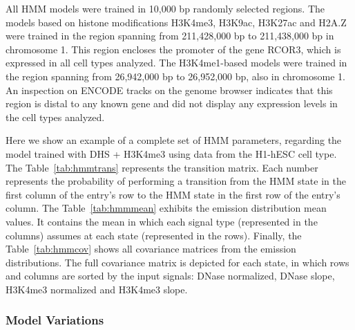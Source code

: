 
All HMM models were trained in 10,000 bp randomly selected regions.
The models based on histone modifications H3K4me3, H3K9ac, H3K27ac
and H2A.Z were trained in the region spanning from 211,428,000 bp to
211,438,000 bp in chromosome 1. This region encloses the promoter of 
the gene RCOR3, which is expressed in all cell types analyzed.
The H3K4me1-based models were trained in the region spanning from 26,942,000 bp to
26,952,000 bp, also in chromosome 1. An inspection on ENCODE tracks on the genome 
browser indicates that this region is distal to any known gene and did not 
display any expression levels in the cell types analyzed.

Here we show an example of a complete set of HMM parameters,
regarding the model trained with DHS + H3K4me3 using data from the
H1-hESC cell type. The Table~\ref{tab:hmmtrans} represents the transition
matrix. Each number represents the probability of performing a
transition from the HMM state in the first column of the entry's
row to the HMM state in the first row of the entry's column. The
Table~\ref{tab:hmmmean} exhibits the emission distribution mean values.
It contains the mean in which each signal type (represented in the columns)
assumes at each state (represented in the rows). Finally, the
Table~\ref{tab:hmmcov} shows all covariance matrices from the emission
distributions. The full covariance matrix is depicted for each state,
in which rows and columns are sorted by the input signals: DNase normalized,
DNase slope, H3K4me3 normalized and H3K4me3 slope.

\subsubsection{Model Variations}
\label{sec:model.variations}






